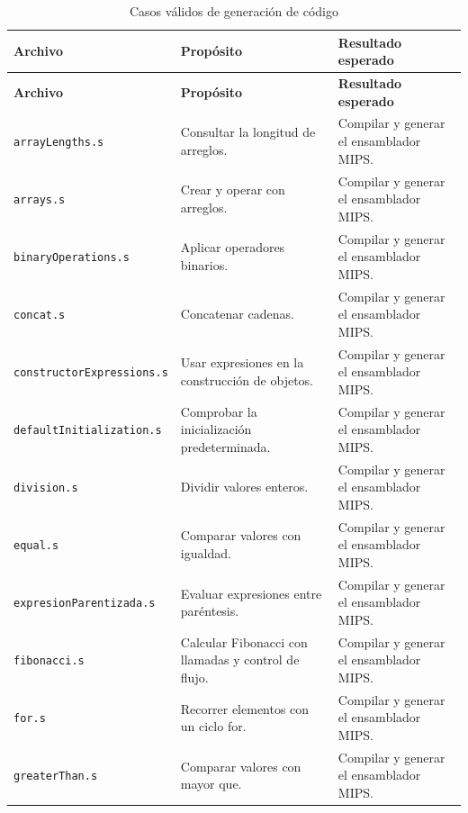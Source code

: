 \begingroup
\small
\renewcommand{\arraystretch}{1.2}
\setlength{\tabcolsep}{5pt}
\setlength{\LTleft}{0pt}
\setlength{\LTright}{0pt plus 1fill}
\begin{longtable}{|>{\raggedright\arraybackslash}p{}|>{\raggedright\arraybackslash}p{}|>{\raggedright\arraybackslash}p{}|}
\caption{Casos válidos de generación de código}\label{tab:codegen-validos}\\
\hline
\textbf{Archivo} & \textbf{Propósito} & \textbf{Resultado esperado} \\ \hline
\endfirsthead
\hline
\textbf{Archivo} & \textbf{Propósito} & \textbf{Resultado esperado} \\ \hline
\endhead
\texttt{arrayLengths\allowbreak .s} & Consultar la longitud de arreglos. & Compilar y generar el ensamblador MIPS. \\ \hline
\texttt{arrays\allowbreak .s} & Crear y operar con arreglos. & Compilar y generar el ensamblador MIPS. \\ \hline
\texttt{binaryOperations\allowbreak .s} & Aplicar operadores binarios. & Compilar y generar el ensamblador MIPS. \\ \hline
\texttt{concat\allowbreak .s} & Concatenar cadenas. & Compilar y generar el ensamblador MIPS. \\ \hline
\texttt{constructorExpressions\allowbreak .s} & Usar expresiones en la construcción de objetos. & Compilar y generar el ensamblador MIPS. \\ \hline
\texttt{defaultInitialization\allowbreak .s} & Comprobar la inicialización predeterminada. & Compilar y generar el ensamblador MIPS. \\ \hline
\texttt{division\allowbreak .s} & Dividir valores enteros. & Compilar y generar el ensamblador MIPS. \\ \hline
\texttt{equal\allowbreak .s} & Comparar valores con igualdad. & Compilar y generar el ensamblador MIPS. \\ \hline
\texttt{expresionParentizada\allowbreak .s} & Evaluar expresiones entre paréntesis. & Compilar y generar el ensamblador MIPS. \\ \hline
\texttt{fibonacci\allowbreak .s} & Calcular Fibonacci con llamadas y control de flujo. & Compilar y generar el ensamblador MIPS. \\ \hline
\texttt{for\allowbreak .s} & Recorrer elementos con un ciclo for. & Compilar y generar el ensamblador MIPS. \\ \hline
\texttt{greaterThan\allowbreak .s} & Comparar valores con mayor que. & Compilar y generar el ensamblador MIPS. \\ \hline

\end{longtable}
